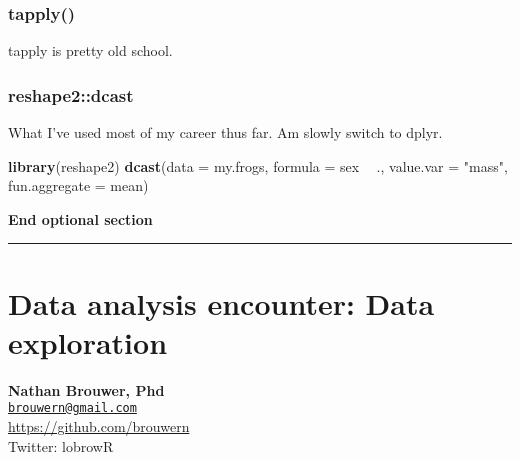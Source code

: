 \documentclass[]{book}
\newenvironment{Shaded}{\begin{snugshade}}{\end{snugshade}}
\newcommand{\KeywordTok}[1]{\textcolor[rgb]{0.13,0.29,0.53}{\textbf{#1}}}
\newcommand{\DataTypeTok}[1]{\textcolor[rgb]{0.13,0.29,0.53}{#1}}
\newcommand{\StringTok}[1]{\textcolor[rgb]{0.31,0.60,0.02}{#1}}
\newcommand{\OperatorTok}[1]{\textcolor[rgb]{0.81,0.36,0.00}{\textbf{#1}}}
\newcommand{\NormalTok}[1]{#1}
\theoremstyle{definition}
\theoremstyle{definition}
\theoremstyle{definition}
\theoremstyle{remark}
\begin{document}
\subsection{tapply()}\label{tapply}

tapply is pretty old school.

\begin{Shaded}
\end{Shaded}

\subsection{reshape2::dcast}\label{reshape2dcast}

What I've used most of my career thus far. Am slowly switch to dplyr.

\begin{Shaded}
\begin{Highlighting}[]
\KeywordTok{library}\NormalTok{(reshape2)}
\KeywordTok{dcast}\NormalTok{(}\DataTypeTok{data =}\NormalTok{ my.frogs,}
      \DataTypeTok{formula =}\NormalTok{ sex }\OperatorTok{~}\StringTok{ }\NormalTok{.,}
      \DataTypeTok{value.var =} \StringTok{"mass"}\NormalTok{,}
      \DataTypeTok{fun.aggregate  =}\NormalTok{ mean)}
\end{Highlighting}
\end{Shaded}

\textbf{End optional section}

\begin{center}\rule{0.5\linewidth}{\linethickness}\end{center}

\chapter{Data analysis encounter: Data
exploration}\label{data-analysis-encounter-data-exploration}

\textbf{Nathan Brouwer, Phd}\\
\href{mailto:brouwern@gmail.com}{\nolinkurl{brouwern@gmail.com}}\\
\url{https://github.com/brouwern}\\
Twitter: lobrowR
\end{document}
